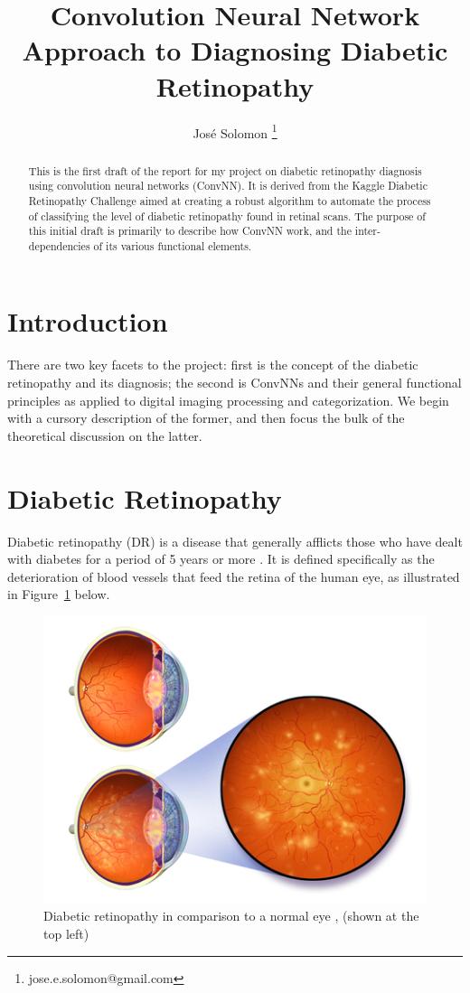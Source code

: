 \documentclass[letterpaper,12pt]{article}
\title{Convolution Neural Network Approach to Diagnosing Diabetic Retinopathy}
\author{Jos\'e Solomon \thanks{jose.e.solomon@gmail.com} }
\date{}
\newcommand{\figref}[1]{Figure~\ref{#1}}
\begin{document}
\maketitle
\begin{abstract}
This is the first draft of the report for my project on diabetic retinopathy diagnosis using convolution neural networks (ConvNN). It is derived from the Kaggle Diabetic Retinopathy Challenge \cite{kaggle} aimed at creating a robust algorithm to automate the process of classifying the level of diabetic retinopathy found in retinal scans. The purpose of this initial draft is primarily to describe how ConvNN work, and the inter-dependencies  of its various functional elements. 
\end{abstract}
\tableofcontents

\section{Introduction}

There are two key facets to the project: first is the concept of the diabetic retinopathy and its diagnosis; the second is ConvNNs and their general functional principles as applied to digital imaging processing and categorization. We begin with a cursory description of the former, and then focus the bulk of the theoretical discussion on the latter.

\section{Diabetic Retinopathy}

Diabetic retinopathy (DR) is a disease that generally afflicts those who have dealt with diabetes for a period of 5 years or more \cite{nih}. It is defined specifically as the deterioration of blood vessels that feed the retina of the human eye, as illustrated in \figref{eye} below.

\begin{figure}[htbp]
\begin{center}
\includegraphics[scale=0.6]{images/illustration.png}
\caption{Diabetic retinopathy in comparison to a normal eye \cite{wiki}, (shown at the top left)}
\label{eye}
\end{center}
\end{figure}
\end{document}
